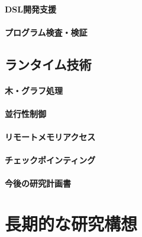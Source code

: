 \documentclass[dvipdfmx]{jsarticle}
\begin{document}
\paragraph{DSL開発支援}

\cite{ppl23c3:satysfi_ted}
\cite{gpce14:libdsl}

\paragraph{プログラム検査・検証}
\cite{ppl21c3:mixed-size_genmc,ppl23c3:mixed-size_genmc}

\cite{ppl22:plags}
\cite{aplas16:pyblame}

\subsection*{ランタイム技術}

\paragraph{木・グラフ処理}

\cite{fhpc16:s6raph,jip21:hyper_gemini}
\cite{ijpp16:tree_skel,jssst16:nbody_locality,jssst14:par_traversal,pro19o:centaurus,jip20:centaurus}
\cite{adbis18:par_xpath,cloudcomp20:xpath}

\cite{ngc18:pregel}
\cite{ispass22:vipp}

\paragraph{並行性制御}
\cite{icpp15:htm,jip22:compth}

\paragraph{リモートメモリアクセス}
\cite{ipdrm20:menps,ispass21:ib_odp,jip22:argodsm,pro22o:far_memory,ppl23c3:far_memory,ppl23c3:redn}

\paragraph{チェックポインティング}
\cite{splash22:mvnb,ppl23:notebook}

\cite{jssst22:checkpoint}


\newpage
\begin{center}
\LARGE\bfseries 今後の研究計画書
\end{center}

\section*{長期的な研究構想}
\end{document}
